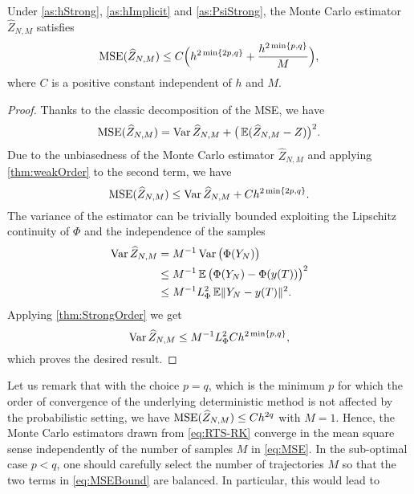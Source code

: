 \documentclass[10pt]{article}
\begin{document}
\begin{theorem}\label{thm:MSEMonteCarlo} Under \cref{as:hStrong}, \cref{as:hImplicit} and \cref{as:PsiStrong}, the Monte Carlo estimator $\hat Z_{N,M}$ satisfies
	\begin{equation}\label{eq:MSEBound}
		\operatorname{MSE}(\widehat Z_{N,M}) \leq C\Big(h^{2\min\{2p, q\}} + \frac{h^{2\min\{p, q\}}}{M}\Big),
	\end{equation}
	where $C$ is a positive constant independent of $h$ and $M$.
\end{theorem}
\begin{proof} Thanks to the classic decomposition of the MSE, we have
	\begin{equation}\label{eq:MSEDecomposition}
		\operatorname{MSE}(\widehat Z_{N,M}) = \operatorname{Var} \widehat Z_{N,M}  + \big(\operatorname{\mathbb{E}}(\widehat Z_{N,M} - Z)\big)^2.
	\end{equation}
	Due to the unbiasedness of the Monte Carlo estimator $\hat Z_{N, M}$ and applying \cref{thm:weakOrder} to the second term, we have
	\begin{equation}\label{eq:MSEWeakOrder}
		\operatorname{MSE}(\widehat Z_{N,M}) \leq \operatorname{Var} \widehat Z_{N,M}  + Ch^{2\min\{2p, q\}}.
	\end{equation}
	The variance of the estimator can be trivially bounded  exploiting the Lipschitz continuity of $\Phi$ and the independence of the samples 
	\begin{equation}\label{eq:MSELipschitz}
	\begin{aligned}
		\operatorname{Var}\widehat Z_{N, M} &= M^{-1} \operatorname{Var}\big(\Phi(Y_N)\big)\\
		&\leq M^{-1} \operatorname{\mathbb{E}}\big(\Phi(Y_N) - \Phi(y(T))\big)^2 \\
		&\leq M^{-1} L_\Phi^2 \operatorname{\mathbb{E}} \lVert Y_N - y(T)\rVert^2.
	\end{aligned}
	\end{equation}
	Applying \cref{thm:StrongOrder} we get
	\begin{equation}
		\operatorname{Var}\widehat Z_{N,M} \leq M^{-1} L_\Phi^2 Ch^{2\min\{p, q\}},
	\end{equation}
	which proves the desired result.
\end{proof}
Let us remark that with the choice $p = q$, which is the minimum $p$ for which the order of convergence of the underlying deterministic method is not affected by the probabilistic setting, we have $\operatorname{MSE}(\widehat Z_{N,M}) \leq Ch^{2q}$ with $M = 1$. Hence, the Monte Carlo estimators drawn from \eqref{eq:RTS-RK} converge in the mean square sense independently of the number of samples $M$ in \eqref{eq:MSE}. In the sub-optimal case $p < q$, one should carefully select the number of trajectories $M$ so that the two terms in \eqref{eq:MSEBound} are balanced. In particular, this would lead to
\end{document}
